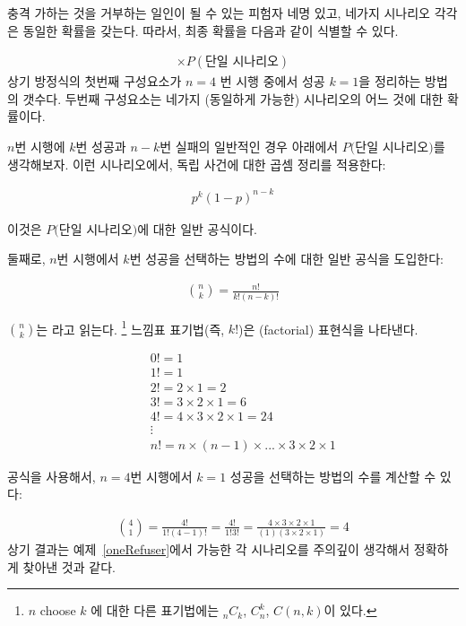 충격 가하는 것을 거부하는 일인이 될 수 있는 피험자 네명 있고, 네가지 시나리오 각각은 동일한 확률을 갖는다. 따라서, 최종 확률을 다음과 같이 식별할 수 있다.

\begin{eqnarray}
[\text{시나리오 갯수 (\#)}] \times P(\text{단일 시나리오})
\label{genBinomialFormula}
\end{eqnarray}
상기 방정식의 첫번째 구성요소가 $n=4$ 번 시행 중에서 성공 $k=1$을 정리하는 방법의 갯수다. 두번째 구성요소는 네가지 (동일하게 가능한) 시나리오의 어느 것에 대한 확률이다.

$n$번 시행에 $k$번 성공과 $n-k$번 실패의 일반적인 경우 아래에서 $P($단일 시나리오$)$를 생각해보자. 이런 시나리오에서, 독립 사건에 대한 곱셈 정리를 적용한다:

\begin{eqnarray*}
p^k(1-p)^{n-k}
\end{eqnarray*}

이것은 $P($단일 시나리오$)$에 대한 일반 공식이다.

둘째로, $n$번 시행에서 $k$번 성공을 선택하는 방법의 수에 대한 일반 공식을 도입한다:

\begin{eqnarray*}
{n\choose k} = \frac{n!}{k!(n-k)!}
\end{eqnarray*}

${n\choose k}$는  라고 읽는다. \footnote{$n$ choose $k$ 에 대한 다른 표기법에는 $_nC_k$, $C_n^k$, $C(n,k)$이 있다.} 느낌표 표기법(즉, $k!$)은 (factorial)\label{factorialDefinitionInTheBinomialSection} 표현식을 나타낸다.

\begin{eqnarray*}
&& 0! = 1 \label{zeroFactorial} \\
&& 1! = 1 \\
&& 2! = 2\times1 = 2 \\
&& 3! = 3\times2\times1 = 6 \\
&& 4! = 4\times3\times2\times1 = 24 \\
&& \vdots \\
&& n! = n\times(n-1)\times...\times3\times2\times1
\end{eqnarray*}

공식을 사용해서, $n=4$번 시행에서 $k=1$ 성공을 선택하는 방법의 수를 계산할 수 있다:  

\begin{eqnarray*}
{4 \choose 1} = \frac{4!}{1!(4-1)!} =  \frac{4!}{1!3!} 
	= \frac{4\times3\times2\times1}{(1)(3\times2\times1)} = 4
\end{eqnarray*}
상기 결과는 예제~\ref{oneRefuser}에서 가능한 각 시나리오를 주의깊이 생각해서 정확하게 찾아낸 것과 같다.

